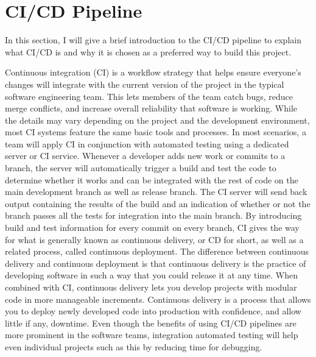 \section{CI/CD Pipeline} \label{sec:cicd}
In this section, I will give a brief introduction to the CI/CD pipeline to explain what CI/CD is and why it is chosen as a preferred way to build this project.

Continuous integration (CI) is a workflow strategy that helps ensure everyone's changes will integrate with the current version of the project in the typical software engineering team. This lets members of the team catch bugs, reduce merge conflicts, and increase overall reliability that software is working. While the details may vary depending on the project and the development environment, most CI systems feature the same basic tools and processes. In most scenarios, a team will apply CI in conjunction with automated testing using a dedicated server or CI service. Whenever a developer adds new work or commits to a branch, the server will automatically trigger a build and test the code to determine whether it works and can be integrated with the rest of code on the main development branch as well as release branch. The CI server will send back output containing the results of the build and an indication of whether or not the branch passes all the tests for integration into the main branch. By introducing build and test information for every commit on every branch, CI gives the way for what is generally known as continuous delivery, or CD for short, as well as a related process, called continuous deployment. The difference between continuous delivery and continuous deployment is that continuous delivery is the practice of developing software in such a way that you could release it at any time. When combined with CI, continuous delivery lets you develop projects with modular code in more manageable increments. 
Continuous delivery is a process that allows you to deploy newly developed code into production with confidence, and allow little if any, downtime. Even though the benefits of using CI/CD pipelines are more prominent in the software teams, integration automated testing will help even individual projects such as this by reducing time for debugging.

